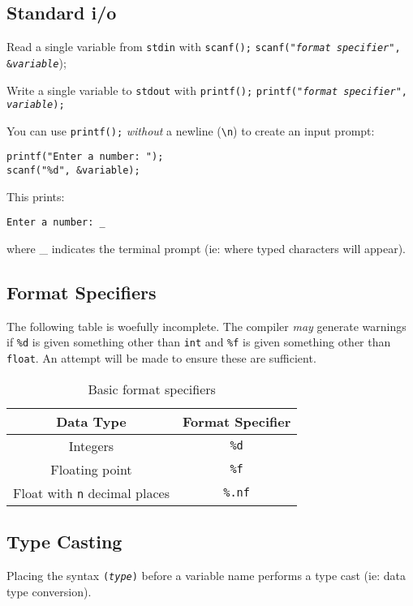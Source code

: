 \documentclass{lab}
\begin{document}
\begin{multicols}{2}
\subsection{Standard i/o}

Read a single variable from \texttt{stdin} with \texttt{scanf();}
\texttt{scanf("\textit{format specifier}", \&\textit{variable}});

Write a single variable to \texttt{stdout} with \texttt{printf();}
\texttt{printf("\textit{format specifier}", \textit{variable});}

You can use \texttt{printf();} \textit{without} a newline (\texttt{\textbackslash n}) to create an input prompt:

\begin{lstlisting}[style=CStyle]
printf("Enter a number: ");
scanf("%d", &variable);
\end{lstlisting}

This prints:

\texttt{Enter a number: \_}

where \_ indicates the terminal prompt (ie: where typed characters will appear).

\subsection{Format Specifiers}
The following table is woefully incomplete. The compiler \textit{may} generate warnings if \texttt{\%d} is given something other than \texttt{int} and \texttt{\%f} is given something other than \texttt{float}. An attempt will be made to ensure these are sufficient.
\begin{table}[H]
\centering
\begin{tabular}{|c|c|}
\hline
Data Type & Format Specifier \\
\hline
Integers & \texttt{\%d} \\
Floating point & \texttt{\%f} \\
Float with \texttt{n} decimal places & \texttt{\%.nf} \\
\hline
\end{tabular}
\caption{Basic format specifiers}
\end{table}

\subsection{Type Casting}
Placing the syntax \texttt{(\textit{type})} before a variable name performs a type cast (ie: data type conversion).


\end{multicols}
\end{document}
